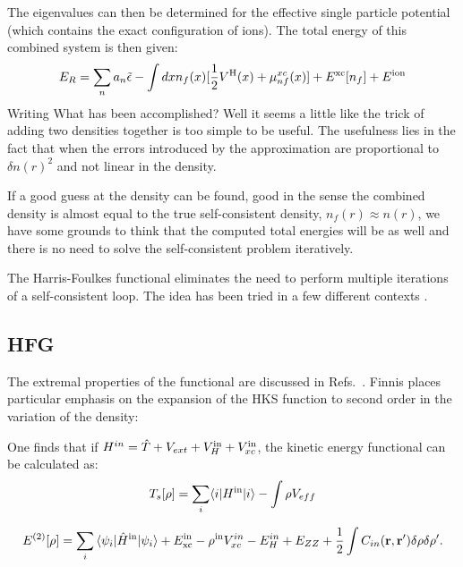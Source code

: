 The eigenvalues can then be determined for the effective single particle
potential (which contains the exact configuration of ions). 
The total energy of this combined system is then given:
%
\begin{equation}
E_{R} = \sum_{n}a_{n}\tilde{\epsilon} - \int dx n_{f}(x)[\frac{1}{2}V^{\rm H}(x) + \mu_{nf}^{xc}(x)] + E^{\rm xc}[n_f]+ E^{\rm ion}
\end{equation}
%
Writing 
What has been accomplished? Well it seems a little like the trick of adding
two densities together is too simple to be useful. The usefulness lies in the
fact that when the errors introduced by the approximation 
are proportional to $\delta n(r)^2$ and not linear in the density. 

If a good guess at the density can be found, good in the sense the combined 
density is almost equal to the true self-consistent 
density, $n_{f}(r) \approx n(r)$, we have some 
grounds to think that the computed total energies will be as well
and there is no need to solve the self-consistent problem iteratively.


The Harris-Foulkes functional eliminates the need to perform multiple iterations
of a self-consistent loop. The idea has been tried in a few different contexts
\cite{harris85, foulkes87, foulkes89, haydock11}.

\subsection{HFG}
The extremal properties of the functional are discussed in Refs.~\cite{finnis, haydock11}.
Finnis places particular emphasis on the expansion of the HKS function to second order in the
variation of the density:

One finds that if $H^{in} = \hat{T}+V_{ext}+V_{H}^{\rm in}+V_{xc}^{\rm in}$,
the kinetic energy functional can be calculated as:
%
\begin{equation}
T_{s}[\rho] = \sum_{i}\langle i|H^{\rm in}|i\rangle - \int\rho V_{eff}
\end{equation}

\begin{equation}
\label{eq:sohks}
E^{(2)}[\rho] = \sum_{i}{\langle \psi_{i}|\hat{H}^{\rm in}|\psi_{i}\rangle} + E_{\rm xc}^{\rm in}
-\rho^{\rm in}V_{xc}^{in} - E_{H}^{in} + E_{ZZ} + \frac{1}{2}\int C_{in}({\bf r},{\bf r}')\delta\rho\delta\rho'.
\end{equation}

